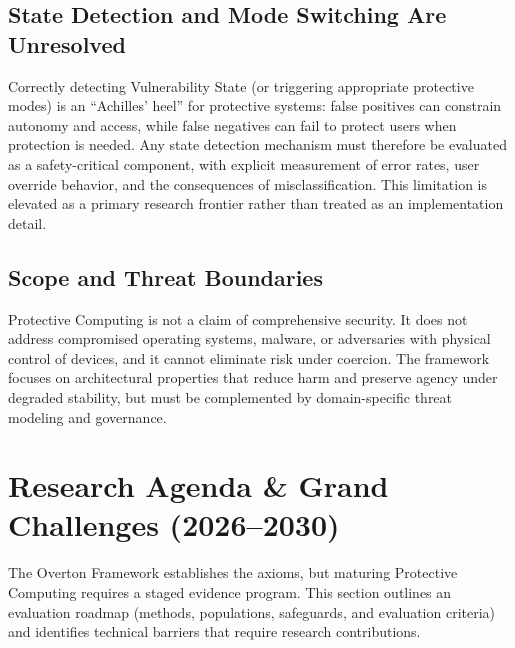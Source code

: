 \documentclass[12pt]{article}
\begin{document}
\subsection{State Detection and Mode Switching Are Unresolved}
Correctly detecting Vulnerability State (or triggering appropriate protective modes) is an ``Achilles' heel'' for protective systems: false positives can constrain autonomy and access, while false negatives can fail to protect users when protection is needed. Any state detection mechanism must therefore be evaluated as a safety-critical component, with explicit measurement of error rates, user override behavior, and the consequences of misclassification. This limitation is elevated as a primary research frontier rather than treated as an implementation detail.

\subsection{Scope and Threat Boundaries}
Protective Computing is not a claim of comprehensive security. It does not address compromised operating systems, malware, or adversaries with physical control of devices, and it cannot eliminate risk under coercion. The framework focuses on architectural properties that reduce harm and preserve agency under degraded stability, but must be complemented by domain-specific threat modeling and governance.

\section{Research Agenda \& Grand Challenges (2026--2030)}
\label{sec:grand-challenges}

The Overton Framework establishes the axioms, but maturing Protective Computing requires a staged evidence program. This section outlines an evaluation roadmap (methods, populations, safeguards, and evaluation criteria) and identifies technical barriers that require research contributions.
\end{document}
